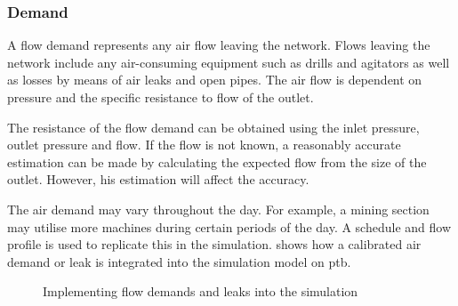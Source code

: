 		\subsubsection{Demand}
			A flow demand represents any air flow leaving the network. Flows leaving the network include any air-consuming equipment such as drills and agitators as well as losses by means of air leaks and open pipes. The air flow is dependent on pressure and the specific resistance to flow of the outlet. 
			\par 
			The resistance of the flow demand can be obtained using the inlet pressure, outlet pressure and flow. If the flow is not known, a reasonably accurate estimation can be made by calculating the expected flow from the size of the outlet. However, his estimation will affect the accuracy.
			\par
			 The air demand may vary throughout the day. For example, a mining section may utilise more machines during certain periods of the day. A schedule and flow profile is used to replicate this in the simulation.  shows how a calibrated air demand or leak is integrated into the simulation model on \gls{ptb}.
			\begin{figure}[h]
				\centering
				\caption{Implementing flow demands and leaks into the simulation} 
				\label{fig: Demand component}
			\end{figure}
